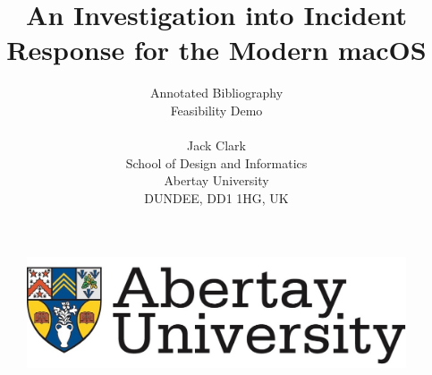 \documentclass[11pt,a4paper]{article}
\title{An Investigation into Incident Response for the Modern macOS}
\author{Annotated Bibliography\\Feasibility Demo\\ \\Jack Clark\\School of Design and Informatics\\Abertay University\\DUNDEE, DD1 1HG, UK}
\begin{document}

\begin{figure}
		\includegraphics[width=\linewidth]{Abertay}
\end{figure} 

\maketitle

\newpage 


\nocite{*}


\begin{flushleft}
	\printbibliography
\end{flushleft}
\end{document}
